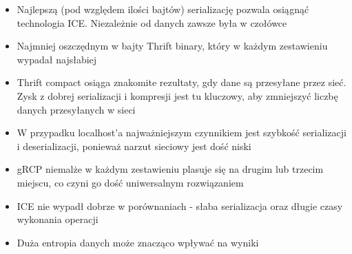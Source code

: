 \documentclass[12pt]{article}
\begin{document}
\begin{itemize}
    \item Najlepszą (pod względem ilości bajtów) serializację pozwala osiągnąć technologia ICE. Niezależnie od danych zawsze była w czołówce
    \item Najmniej oszczędnym w bajty Thrift binary, który w każdym zestawieniu wypadał najsłabiej
    \item Thrift compact osiąga znakomite rezultaty, gdy dane są przesyłane przez sieć. Zysk z dobrej serializacji i kompresji jest tu kluczowy, aby zmniejszyć liczbę danych przesyłanych w sieci
    \item W przypadku localhost'a najważniejszym czynnikiem jest szybkość serializacji i deserializacji, ponieważ narzut sieciowy jest dość niski
    \item gRCP niemalże w każdym zestawieniu plasuje się na drugim lub trzecim miejscu, co czyni go dość uniwersalnym rozwiązaniem
    \item ICE nie wypadł dobrze w porównaniach - słaba serializacja oraz długie czasy wykonania operacji
    \item Duża entropia danych może znacząco wpływać na wyniki
\end{itemize}
\end{document}
